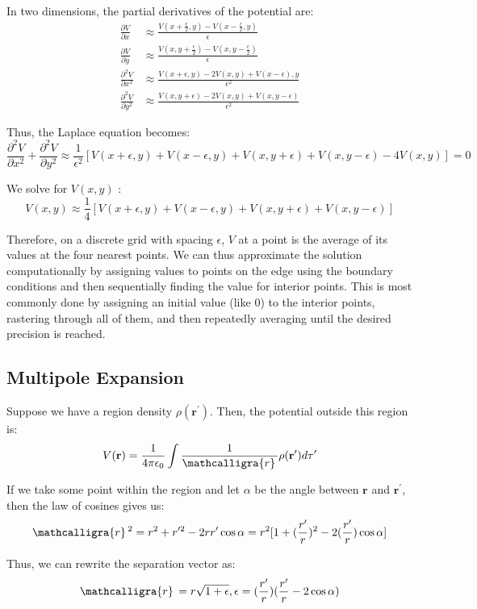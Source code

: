 \documentclass{article}
\newcommand{\scriptr}{\mathcalligra{r}\,}
\begin{document}
In two dimensions, the partial derivatives of the potential are:
\begin{align*}
    \frac{\partial V}{\partial x}&\approx \frac{V(x+\frac{\epsilon}{2}, y)-V(x-\frac{\epsilon }{2}, y)}{\epsilon } \\
    \frac{\partial V}{\partial y}&\approx \frac{V(x, y+\frac{\epsilon }{2})-V(x, y-\frac{\epsilon }{2})}{\epsilon } \\
    \frac{\partial^2 V}{\partial x^2}&\approx \frac{V(x+\epsilon, y)-2V(x,y)+V(x-\epsilon ), y}{\epsilon ^2} \\
    \frac{\partial^2 V}{\partial y^2}&\approx \frac{V(x, y+\epsilon )-2V(x, y)+V(x, y-\epsilon )}{\epsilon^2}
\end{align*}

Thus, the Laplace equation becomes:
\[
    \frac{\partial^2 V}{\partial x^2}+\frac{\partial^2 V}{\partial y^2}\approx \frac{1}{\epsilon^2}[V(x+\epsilon, y)+V(x-\epsilon, y)+V(x,y+\epsilon )+V(x, y-\epsilon )-4V(x,y)]=0
\]

We solve for \(V(x,y)\) :
\[
    V(x,y)\approx \frac{1}{4}[V(x+\epsilon , y)+V(x-\epsilon , y)+V(x, y+\epsilon )+V(x, y-\epsilon )]
\]

Therefore, on a discrete grid with spacing \(\epsilon \), \(V\) at a point is the average of its values at the four nearest points. We can thus 
approximate the solution computationally by assigning values to points on the edge using the boundary conditions and then sequentially finding the value for interior points. This is most commonly done
by assigning an initial value (like 0) to the interior points, rastering through all of them, and then repeatedly averaging until the desired precision is reached.

\subsection{Multipole Expansion}
Suppose we have a region density \(\rho (\mathbf{r}^{\prime} )\). Then, the potential outside this region is:
\[
    V(\mathbf{r})=\frac{1}{4 \pi \epsilon_0}\int \frac{1}{\scriptr}\rho (\mathbf{r}^{\prime} )d \tau^{\prime} 
\]

If we take some point within the region and let \(\alpha \) be the angle between \(\mathbf{r}\) and \(\mathbf{r}^{\prime}\), then the law of cosines gives us:
\[
    \scriptr^2=r^2+r^{\prime 2}-2rr^{\prime} \cos \alpha =r^2[1+(\frac{r^{\prime} }{r})^2-2(\frac{r^{\prime} }{r})\cos \alpha ]
\]   

Thus, we can rewrite the separation vector as:
\[
    \scriptr=r\sqrt{1+\epsilon}, \epsilon =(\frac{r^{\prime} }{r})(\frac{r^{\prime} }{r}-2\cos \alpha )
\]
\end{document}
